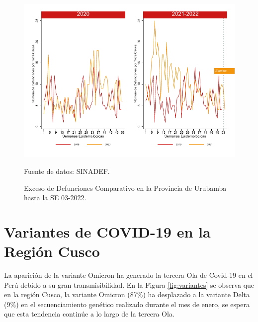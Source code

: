\documentclass[12pt,a4paper,openany]{book}
\begin{document}
		\begin{figure}[h]
			\caption{Exceso de Defunciones Comparativo en la Provincia de Urubamba hasta la SE 03-2022.}\label{fig:exceso_urub}
			\begin{center}
				\includegraphics[width=0.7\linewidth]{../figuras/exceso_13}
			\end{center}
			{\footnotesize {Fuente de datos: SINADEF.}}
		\end{figure}
		
		\clearpage
		
		\clearpage
		
		\section* {Variantes de COVID-19 en la Región Cusco}
		\noindent La aparición de la variante Omicron ha generado la tercera Ola de Covid-19 en el Perú debido a su gran transmisibilidad. En la Figura \ref{fig:variantes} se observa que en la región Cusco, la variante Omicron (87$\%$) ha desplazado a la variante Delta (9$\%$) en el secuenciamiento genético realizado durante el mes de enero, se espera que esta tendencia continúe a lo largo de la tercera Ola. 
		
\end{document}
